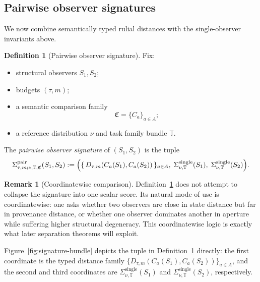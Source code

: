 \documentclass[11pt,twoside]{article}
\theoremstyle{definition}
\newtheorem{definition}[theorem]{Definition}
\newtheorem{remark}[theorem]{Remark}
\newcommand{\TaskBundle}{\mathbb{T}}
\begin{document}
\subsection{Pairwise observer signatures}
\label{subsec:pairwise-observer-signatures}

We now combine semantically typed rulial distances with the single-observer invariants above.

\begin{definition}[Pairwise observer signature]
\label{def:pairwise-observer-signature}
Fix:
\begin{itemize}[leftmargin=*]
  \item structural observers \(S_1,S_2\);
  \item budgets \((\tau,m)\);
  \item a semantic comparison family
        \[
          \mathfrak{C}=\{C_a\}_{a\in A};
        \]
  \item a reference distribution \(\nu\) and task family bundle \(\TaskBundle\).
\end{itemize}
The \emph{pairwise observer signature} of \((S_1,S_2)\) is the tuple
\[
  \Sigma^{\mathrm{pair}}_{\tau,m;\nu,\TaskBundle,\mathfrak{C}}(S_1,S_2)
  :=
  \Bigl(
    \{\, D_{\tau,m}(C_a(S_1),C_a(S_2)) \,\}_{a\in A},\;
    \Sigma^{\mathrm{single}}_{\nu,\TaskBundle}(S_1),\;
    \Sigma^{\mathrm{single}}_{\nu,\TaskBundle}(S_2)
  \Bigr).
\]
\end{definition}

\begin{remark}[Coordinatewise comparison]
\label{rem:coordinatewise-comparison}
Definition~\ref{def:pairwise-observer-signature} does not attempt to collapse the signature into one scalar score. Its natural mode of use is coordinatewise: one asks whether two observers are close in state distance but far in provenance distance, or whether one observer dominates another in aperture while suffering higher structural degeneracy. This coordinatewise logic is exactly what later separation theorems will exploit.
\end{remark}

Figure~\ref{fig:signature-bundle} depicts the tuple in Definition~\ref{def:pairwise-observer-signature} directly: the first coordinate is the typed distance family \(\{D_{\tau,m}(C_a(S_1),C_a(S_2))\}_{a\in A}\), and the second and third coordinates are \(\Sigma^{\mathrm{single}}_{\nu,\TaskBundle}(S_1)\) and \(\Sigma^{\mathrm{single}}_{\nu,\TaskBundle}(S_2)\), respectively.
\end{document}
